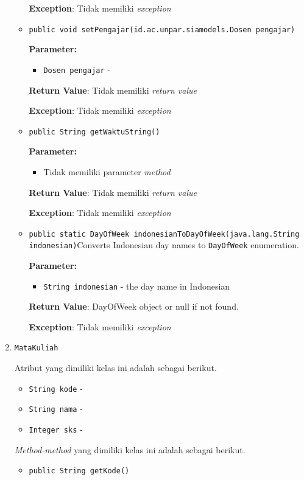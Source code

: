 \documentclass{article}
\begin{document}
\begin{enumerate}
\begin{itemize}
\textbf{Exception}: Tidak memiliki \textit{exception}

\item \texttt{public void setPengajar(id.ac.unpar.siamodels.Dosen pengajar)}

\textbf{Parameter:}
\begin{itemize}
\item \texttt{Dosen pengajar} - 
\end{itemize}
\textbf{Return Value}: Tidak memiliki \textit{return value}

\textbf{Exception}: Tidak memiliki \textit{exception}

\item \texttt{public String getWaktuString()}

\textbf{Parameter:}
\begin{itemize}
\item Tidak memiliki parameter \textit{method}
\end{itemize}
\textbf{Return Value}: Tidak memiliki \textit{return value}

\textbf{Exception}: Tidak memiliki \textit{exception}

\item \texttt{public static DayOfWeek indonesianToDayOfWeek(java.lang.String indonesian)}Converts Indonesian day names to \texttt{DayOfWeek} enumeration.

\textbf{Parameter:}
\begin{itemize}
\item \texttt{String indonesian} - 
the day name in Indonesian
\end{itemize}
\textbf{Return Value}: DayOfWeek object or null if not found.

\textbf{Exception}: Tidak memiliki \textit{exception}

\end{itemize}
\item \texttt{MataKuliah}



Atribut yang dimiliki kelas ini adalah sebagai berikut.
\begin{itemize}
\item \texttt{String kode} - 
\item \texttt{String nama} - 
\item \texttt{Integer sks} - 
\end{itemize}
\textit{Method-method} yang dimiliki kelas ini adalah sebagai berikut.
\begin{itemize}
\item \texttt{public String getKode()}


\end{itemize}
\end{enumerate}
\end{document}

